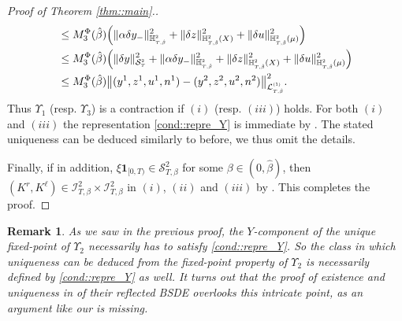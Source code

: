 \documentclass[10pt]{article} %
\newtheorem{remark}[theorem]{Remark}
\newcommand\cI{\mathcal I}
\newcommand\cL{\mathcal L}
\newcommand\cS{\mathcal S}
\newcommand{\smalltext}[1]{\text{\fontsize{4}{4}\selectfont$#1$}}
\def \H{\mathbb{H}}
\newcommand{\1}{\mathbf{1}}
\begin{document}
\begin{proof}[Proof of Theorem \ref{thm::main}.]
\begin{align*}
		&\leq M^\Phi_3(\hat\beta) \Big(\|\alpha\delta y_-\|^2_{\H^\smalltext{2}_{\smalltext{T}\smalltext{,}\smalltext{\hat\beta}}} + \|\delta z\|^2_{\H^\smalltext{2}_{\smalltext{T}\smalltext{,}\smalltext{\hat\beta}}(X)} + \|\delta u\|^2_{\H^\smalltext{2}_{\smalltext{T}\smalltext{,}\smalltext{\hat\beta}}(\mu)} \Big)  \nonumber\\
		&\leq M^\Phi_3(\hat\beta) \Big( \|\delta y\|^2_{\cS^\smalltext{2}_\smalltext{T}} + \|\alpha\delta y_-\|^2_{\H^\smalltext{2}_{\smalltext{T}\smalltext{,}\smalltext{\hat\beta}}} + \|\delta z\|^2_{\H^\smalltext{2}_{\smalltext{T}\smalltext{,}\smalltext{\hat\beta}}(X)} + \|\delta u\|^2_{\H^\smalltext{2}_{\smalltext{T}\smalltext{,}\smalltext{\hat\beta}}(\mu)} \Big)  \nonumber\\
		&\leq M^\Phi_3(\hat\beta)\big\|(y^1, z^1, u^1, n^1) - (y^2, z^2, u^2, n^2)\big\|^2_{\cL^\smalltext{(1)}_{\smalltext{T}\smalltext{,}\smalltext{\hat\beta}}}.
	\end{align*} 
	Thus $\Upsilon_1$ (resp. $\Upsilon_3$) is a contraction if $(i)$ (resp. $(iii)$) holds. For both $(i)$ and $(iii)$ the representation \ref{cond::repre_Y} is immediate by . The stated uniqueness can be deduced similarly to before, we thus omit the details.
	
	\medskip
	Finally, if in addition, $\xi\mathbf{1}_{[0,T)} \in \cS^2_{T,\beta}$ for some $\beta \in (0,\hat\beta)$, then $(K^r,K^\ell) \in \cI^2_{T,\beta} \times \cI^2_{T,\beta}$ in $(i)$, $(ii)$ and $(iii)$ by . This completes the proof.
\end{proof}


\begin{remark}\label{rem::missing_pieces}
	As we saw in the previous proof, the $Y$-component of the unique fixed-point of $\Upsilon_2$ necessarily has to satisfy \ref{cond::repre_Y}. So the class in which uniqueness can be deduced from the fixed-point property of $\Upsilon_2$ is necessarily defined by \ref{cond::repre_Y} as well. It turns out that the proof of existence and uniqueness in {\rm\cite{grigorova2020optimal}} of their reflected {\rm BSDE} overlooks this intricate point, as an argument like our {\rm{}} is missing.
\end{remark}
\end{document}
